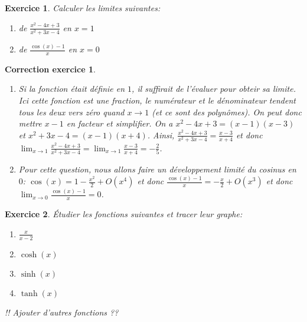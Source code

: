 \documentclass[12pt]{article}
\newtheorem{exercice}{\bf Exercice}
\newtheorem{correction}{\bf Correction exercice}
\newenvironment{exo}{
\begin{exercice}\smallskip\normalfont}{\end{exercice}
}
\newenvironment{cor}{
\begin{correction}\smallskip\normalfont}{\end{correction}
}
\newif\ifcorrige\corrigetrue
\begin{document}


\begin{exo} Calculer les limites suivantes:
\begin{multicols}{2}
\begin{enumerate}
\item de $\frac{x^2-4x+3}{x^2+3x-4}$ en $x=1$
\item de $\frac{\cos(x) - 1}{x}$ en $x=0$
\end{enumerate}
\end{multicols}
\end{exo}

\ifcorrige
\color{magenta}
\begin{cor}
$\qquad$
\begin{enumerate}
\item Si la fonction \'etait d\'efinie en $1$, il suffirait de l'\'evaluer pour obteir sa limite.
  Ici cette fonction est une fraction, le num\'erateur et le d\'enominateur tendent tous les deux vers z\'ero
  quand $x \to 1$ (et ce sont des polyn\^omes).
  On peut donc mettre $x-1$ en facteur et simplifier.
  On a $x^2-4x+3 = (x-1)(x-3)$ et $x^2+3x-4 = (x-1)(x+4)$.
  Ainsi, $\frac{x^2-4x+3}{x^2+3x-4} = \frac{x-3}{x+4}$
  et donc $\lim_{x \to 1} \frac{x^2-4x+3}{x^2+3x-4} = \lim_{x \to 1} \frac{x-3}{x+4} = - \frac25$.

\item Pour cette question, nous allons faire un d\'eveloppement limit\'e du cosinus en $0$:
  $\cos(x) = 1 - \frac{x^2}{2} + O(x^4)$ et donc
  $\frac{\cos(x) - 1}{x} = - \frac{x}{2} + O(x^3)$
  et donc $\lim_{x \to 0} \frac{\cos(x)-1}{x} = 0$.
\end{enumerate}
\end{cor}
\color{black}
\fi



\begin{exo} \'Etudier les fonctions suivantes et tracer leur graphe:
\begin{multicols}{4}
\begin{enumerate}
\item $\frac{x}{x-2}$
\item $\cosh(x)$
\item $\sinh(x)$
\item $\tanh(x)$
\end{enumerate}
\end{multicols}

!! Ajouter d'autres fonctions ??
\end{exo}
\end{document}
